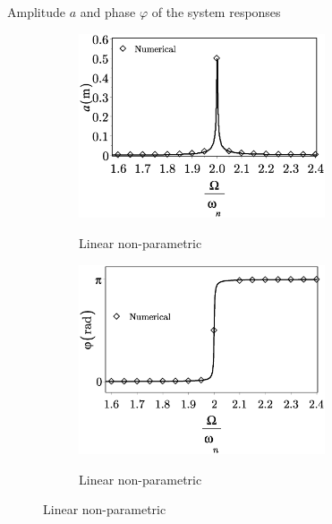 \documentclass[LaTeX2e,10pt]{beamer}
\begin{document}
\begin{frame}{Amplitude $a$ and phase $\varphi$ of the system responses}
\begin{figure}
 \centering
\begin{subfigure}[b]{0.45\textwidth}
{\includegraphics[width=0.8\textwidth]{Images/LinearCase.eps}}
\caption{Linear non-parametric}
\end{subfigure}
\qquad
\begin{subfigure}[b]{0.45\textwidth}
{\includegraphics[width=0.8\textwidth]{Images/CaseAphaseFreq.eps}}
\caption{Linear non-parametric}
\end{subfigure}


\end{figure}
\end{frame}
\end{document}
